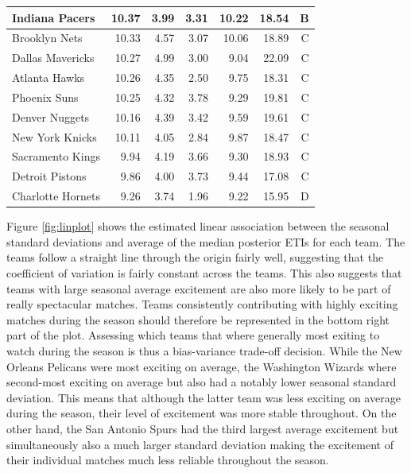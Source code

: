 \documentclass[
  11pt,
]{svjour3}
\theoremstyle{nonumberplain}
\begin{document}
\begin{table}
\begin{tabular}[t]{lrr|rrr|r}
Indiana Pacers & 10.37 & 3.99 & 3.31 & 10.22 & 18.54 & B\\
\hline
Brooklyn Nets & 10.33 & 4.57 & 3.07 & 10.06 & 18.89 & C\\
Dallas Mavericks & 10.27 & 4.99 & 3.00 & 9.04 & 22.09 & C\\
Atlanta Hawks & 10.26 & 4.35 & 2.50 & 9.75 & 18.31 & C\\
Phoenix Suns & 10.25 & 4.32 & 3.78 & 9.29 & 19.81 & C\\
Denver Nuggets & 10.16 & 4.39 & 3.42 & 9.59 & 19.61 & C\\
New York Knicks & 10.11 & 4.05 & 2.84 & 9.87 & 18.47 & C\\
Sacramento Kings & 9.94 & 4.19 & 3.66 & 9.30 & 18.93 & C\\
Detroit Pistons & 9.86 & 4.00 & 3.73 & 9.44 & 17.08 & C\\
\hline
Charlotte Hornets & 9.26 & 3.74 & 1.96 & 9.22 & 15.95 & D\\
\bottomrule
\end{tabular}
\end{table}

Figure \ref{fig:linplot} shows the estimated linear association between
the seasonal standard deviations and average of the median posterior
ETIs for each team. The teams follow a straight line through the origin
fairly well, suggesting that the coefficient of variation is fairly
constant across the teams. This also suggests that teams with large
seasonal average excitement are also more likely to be part of really
spectacular matches. Teams consistently contributing with highly
exciting matches during the season should therefore be represented in
the bottom right part of the plot. Assessing which teams that where
generally most exiting to watch during the season is thus a
bias-variance trade-off decision. While the New Orleans Pelicans were
most exciting on average, the Washington Wizards where second-most
exciting on average but also had a notably lower seasonal standard
deviation. This means that although the latter team was less exciting on
average during the season, their level of excitement was more stable
throughout. On the other hand, the San Antonio Spurs had the third
largest average excitement but simultaneously also a much larger
standard deviation making the excitement of their individual matches
much less reliable throughout the season.
\end{document}
